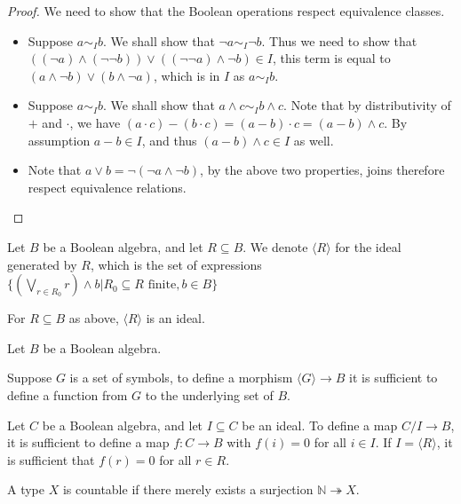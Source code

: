 \begin{proof}
  We need to show that the Boolean operations respect equivalence classes. 
  \begin{itemize}
    \item 
      Suppose $a \sim_I b$. We shall show that $\neg a \sim_I \neg b$. 
      Thus we need to show that 
      $((\neg a) \wedge (\neg \neg b)) \vee ((\neg \neg a) \wedge \neg b) \in I$, 
      this term is equal to 
      $( a \wedge \neg b) \vee (b \wedge \neg a)$, which is in $I$ as $ a\sim_I b$. 
    \item 
      Suppose $ a\sim _I b $. We shall show that 
      $a \wedge c \sim_I b \wedge c$. 
      Note that by distributivity of $+$ and $\cdot$, we have 
      $(a \cdot c) -( b \cdot c) = (a -b ) \cdot c = (a-b) \wedge c$. 
      By assumption $a -b \in I$, and thus $(a-b) \wedge c \in I$ as well. 
    \item Note that $a \vee b = \neg ( \neg a \wedge \neg b)$, by the above two properties, 
      joins therefore respect equivalence relations. 
  \end{itemize}
\end{proof}
\begin{definition}
  Let $B$ be a Boolean algebra, and let $R\subseteq B$. 
  We denote $\langle R\rangle $ for the ideal generated by $R$, 
  which is the set of expressions 
  $\{(\bigvee_{r \in R_0} r) \wedge b| R_0\subseteq R \text{ finite}, b \in B\}$
\end{definition} 
\begin{remark}
  For $R\subseteq B$ as above, $ \langle R \rangle$ is an ideal.
\end{remark}

\begin{remark}\label{rmkMorphismsOutOfQuotient}
  Let $B$ be a Boolean algebra. 
  
  Suppose $G$ is a set of symbols, to define a morphism 
  $\langle G \rangle \to B$ it is sufficient to define 
  a function from $G$ to the underlying set of $B$. 

  Let $C$ be a Boolean algebra, and let $I\subseteq C$ be an ideal. 
  To define a map $C / I \to B$, it is sufficient to define a map $f:C\to B$
  with $f(i) = 0$ for all $i\in I$. 
  If $I = \langle R\rangle $, it is sufficient that $f(r) = 0$ for all $r\in R$. 
\end{remark}
\begin{definition}
  A type $X$ is countable if there merely exists a surjection 
  $\mathbb N \twoheadrightarrow X$. 
\end{definition}

